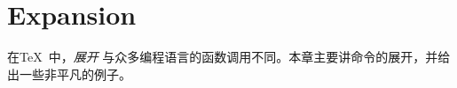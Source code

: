 \documentclass{book}
\begin{document}
\chapter{Expansion}\label{expand}

在\TeX\ 中，\emph{展开} 与众多编程语言的函数调用不同。本章主要讲命令的展开，并给出一些非平凡的例子。

\label{cschap:relax}\label{cschap:expandafter}\label{cschap:noexpand}\label{cschap:afterassignment}\label{cschap:the}
\end{document}
